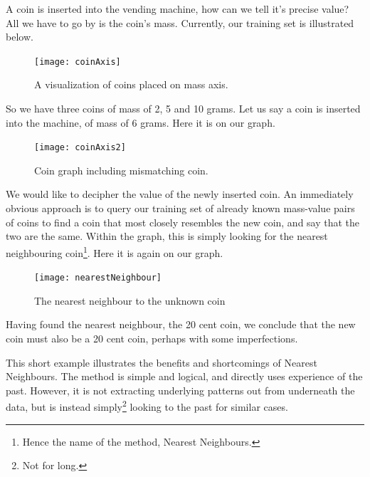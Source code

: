 \documentclass[a4paper, 12pt]{article}
\begin{document}
                \par A coin is inserted into the vending machine, how can we tell it's precise value? All we have to go by is the coin's mass. Currently, our training set is illustrated below.

                \begin{figure}[h]
                    \caption{A visualization of coins placed on mass axis.}
                    \centering
                    \texttt{[image: coinAxis]}
                \end{figure}
                

                \par So we have three coins of mass of 2, 5 and 10 grams. Let us say a coin is inserted into the machine, of mass of 6 grams. Here it is on our graph.

                \begin{figure}[h]
                    \caption{Coin graph including mismatching coin.}
                    \centering
                    \texttt{[image: coinAxis2]}
                \end{figure}

                \par We would like to decipher the value of the newly inserted coin. An immediately obvious approach is to query our training set of already known mass-value pairs of coins to find a coin that most closely resembles the new coin, and say that the two are the same. Within the graph, this is simply looking for the nearest neighbouring coin\footnote{Hence the name of the method, Nearest Neighbours.}. Here it is again on our graph.

                \begin{figure}[h]
                    \caption{The nearest neighbour to the unknown coin}
                    \centering
                    \texttt{[image: nearestNeighbour]}
                \end{figure}

                \par Having found the nearest neighbour, the 20 cent coin, we conclude that the new coin must also be a 20 cent coin, perhaps with some imperfections.

                \par This short example illustrates the benefits and shortcomings of Nearest Neighbours. The method is simple and logical, and directly uses experience of the past. However, it is not extracting underlying patterns out from underneath the data, but is instead simply\footnote{Not for long.} looking to the past for similar cases.
                
\end{document}

